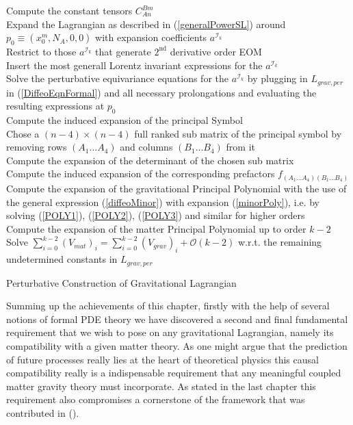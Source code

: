 \documentclass[a4paper,12pt, DIV=14, BCOR=5mm, twoside, headsepline, numbers=noenddot]{scrbook}
\begin{document}
%
%
%
\begin{algorithm}[hbt!]
\SetAlgoLined
{}
Compute the constant tensors $C^{Bm}_{An}$ \\
Expand the Lagrangian as described in (\ref{generalPowerSL}) around $p_0 \equiv (x_0^m,N_A,0,0)$ with expansion coefficients $a^{\mathcal{I}_k}$\\
Restrict to those $a^{\mathcal{I}_k}$ that generate $2^{\text{nd}}$ derivative order EOM \\
Insert the most generall Lorentz invariant expressions for the $a^{\mathcal{I}_k}$\\
Solve the perturbative equivariance equations for the $a^{\mathcal{I}_k}$ by plugging in $L_{grav,per}$ in (\ref{DiffeoEqnFormal}) and all necessary prolongations and evaluating the resulting expressions at $p_0$\\
Compute the induced expansion of the principal Symbol\\
Chose a $(n-4) \times (n-4)$ full ranked sub matrix of the principal symbol by removing rows $(A_1...A_4)$ and columns $(B_1...B_4)$ from it \\
Compute the expansion of the determinant of the chosen sub matrix\\
Compute the induced expansion of the corresponding prefactors $f_{(A_1...A_4)(B_1...B_4)}$ \\
Compute the expansion of the gravitational Principal Polynomial with the use of the general expression (\ref{diffeoMinor}) with expansion (\ref{minorPoly}), i.e. by solving (\ref{POLY1}), (\ref{POLY2}), (\ref{POLY3}) and similar for higher orders \\
Compute the expansion of the matter Principal Polynomial up to order $k-2$\\
Solve $\sum_{i=0}^{k-2} (V_{mat})_i = \sum _{i=0}^{k-2}(V_{grav})_i + \mathcal{O}(k-2)$ w.r.t. the remaining undetermined constants in $L_{grav,per}$
 \caption{Perturbative Construction of Gravitational Lagrangian}\label{Algo2}
\end{algorithm}

Summing up the achievements of this chapter, firstly with the help of several notions of formal PDE theory we have discovered a second and final fundamental requirement that we wish to pose on any gravitational Lagrangian, namely its compatibility with a given matter theory. As one might argue that the prediction of future processes really lies at the heart of theoretical physics this causal compatibility really is a indispensable requirement that any meaningful coupled matter gravity theory must incorporate. As stated in the last chapter this requirement also compromises a cornerstone of the framework that was contributed in (\cite{2018PhRvD..97h4036D}). 
\end{document}
